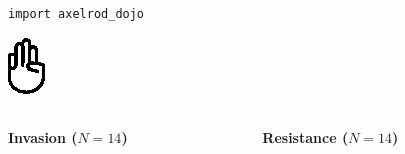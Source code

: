 \documentclass{beamer}
\newcommand{\researchfolder}{$HOME/rsc/axelrod-moran}
\newcommand{\mlresearchfolder}{$HOME/rsc/ml-paper}
\begin{document}
\begin{frame}
    \scalebox{.7}{
        
    }
\end{frame}

\begin{frame}[fragile]{}

    \begin{center}
        \begin{minipage}{0.8\textwidth}
            \begin{verbatim}
import axelrod_dojo
            \end{verbatim}
        \end{minipage}
    \end{center}
\end{frame}


\begin{frame}
    \begin{center}
        \scalebox{.7}{
            
        }
    \end{center}
\end{frame}


\begin{frame}
    \begin{center}
        \includegraphics[height=.8\textheight]{./assets/hunger-games-hand-gesture.eps}


        \tiny
        \vfill
    \end{center}
\end{frame}


\begin{frame}
    \begin{columns}
        \begin{column}{.6\textwidth}
            \footnotesize
            \begin{center}
                \textbf{Invasion (\(N=14\))}\\

                
            \end{center}
        \end{column}
        \begin{column}{.4\textwidth}
            \footnotesize
            \begin{center}
                \textbf{Resistance (\(N=14\))}\\

                
            \end{center}
        \end{column}
    \end{columns}
\end{frame}
\end{document}
